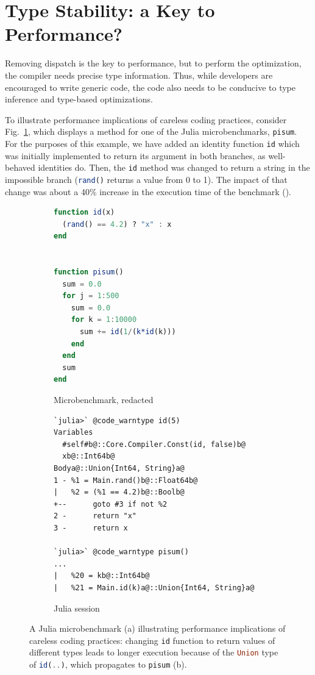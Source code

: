 \documentclass[oneside,openright,titlepage,numbers=noenddot,%
headinclude,footinclude,cleardoublepage=empty,abstract=on,
BCOR=5mm,paper=a4,fontsize=11pt,
dvipsnames
]{scrreprt}
\renewcommand{\c}[1]{\lstinline[language=Julia]!#1!\xspace}
\begin{document}
\section{Type Stability: a Key to Performance?}%
\label{sec:stability}

Removing dispatch is the key to performance, but to perform the optimization,
the compiler needs precise type information. Thus, while developers
are encouraged to write generic code, the code also needs to be conducive
to type inference and type-based optimizations.

To illustrate performance implications of careless
coding practices, consider Fig.~\ref{ide}, which displays a method for one of
the Julia microbenchmarks, \c{pisum}. For the purposes of this example, we
have added an identity function \c{id} which was initially implemented to
return its argument in both branches, as well-behaved identities do.
Then, the \c{id} method was changed to return a string in the impossible
branch (\c{rand()} returns a value from 0 to 1). The impact of that change
was about a 40\% increase in the execution time of the benchmark (\juliaversion).


\begin{figure}[h!]
\centering
\begin{subfigure}[b]{0.49\textwidth}
\centering
\begin{lstlisting}[language=julia,style=jterm]
function id(x)
  (rand() == 4.2) ? "x" : x
end


function pisum()
  sum = 0.0
  for j = 1:500
    sum = 0.0
    for k = 1:10000
      sum += id(1/(k*id(k)))
    end
  end
  sum
end
\end{lstlisting}
\caption{Microbenchmark, redacted}
\end{subfigure}
%
\begin{subfigure}[b]{0.48\textwidth}
\begin{lstlisting}[style=jterm]
`julia>` @code_warntype id(5)
Variables
  #self#b@::Core.Compiler.Const(id, false)b@
  xb@::Int64b@
Bodya@::Union{Int64, String}a@
1 - %1 = Main.rand()b@::Float64b@
|   %2 = (%1 == 4.2)b@::Boolb@
+--      goto #3 if not %2
2 -      return "x"
3 -      return x

`julia>` @code_warntype pisum()
...
|   %20 = kb@::Int64b@
|   %21 = Main.id(k)a@::Union{Int64, String}a@
\end{lstlisting}
\caption{Julia session}
%
\end{subfigure}
\caption{A Julia microbenchmark (a) illustrating performance implications
  of careless coding practices: changing \c{id} function to return
  values of different types leads to longer execution
  because of the \c{Union} type of \c{id(..)}, which propagates to \c{pisum} (b).}%
\label{ide}
\end{figure}
\end{document}
